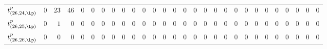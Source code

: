 \begin{tabular}{r|rrrrrrrrrrrrrrrrrrrrrrrrrrr}
  $t^{p}_{(26,24,\Lp)}$ & $0$ & $23$ & $46$ & $0$ & $0$ & $0$ & $0$ & $0$ & $0$ & $0$ & $0$ & $0$ & $0$ & $0$ & $0$ & $0$ & $0$ & $0$ & $0$ & $0$ & $0$ & $0$ & $0$ & $0$ & $0$ & $0$ & $0$ \\
  $t^{p}_{(26,25,\Lp)}$ & $0$ & $1$ & $0$ & $0$ & $0$ & $0$ & $0$ & $0$ & $0$ & $0$ & $0$ & $0$ & $0$ & $0$ & $0$ & $0$ & $0$ & $0$ & $0$ & $0$ & $0$ & $0$ & $0$ & $0$ & $0$ & $0$ & $0$ \\
  $t^{p}_{(26,26,\Lp)}$ & $0$ & $0$ & $0$ & $0$ & $0$ & $0$ & $0$ & $0$ & $0$ & $0$ & $0$ & $0$ & $0$ & $0$ & $0$ & $0$ & $0$ & $0$ & $0$ & $0$ & $0$ & $0$ & $0$ & $0$ & $0$ & $0$ & $0$ \\
\end{tabular}

